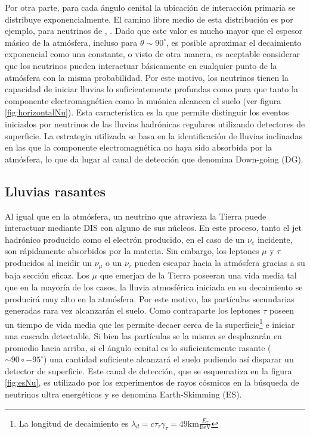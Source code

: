 Por otra parte, para cada \'angulo cenital la ubicaci\'on de interacci\'on primaria se distribuye exponencialmente.
El camino libre medio de esta distribuci\'on es por ejemplo, para neutrinos de , \cite{cite:Gandhi}. 
Dado que este valor es mucho mayor que el espesor m\'asico de la atmósfera, incluso para $\theta\sim90^\circ$, es posible aproximar el decaimiento exponencial como una constante, o visto de otra manera, es aceptable considerar que los neutrinos pueden interactuar básicamente en cualquier punto de la atmósfera con la misma probabilidad.
Por este motivo, los neutrinos tienen la capacidad de iniciar lluvias lo suficientemente profundas como para que tanto la componente electromagnética como la muónica alcancen el suelo (ver figura \ref{fig:horizontalNu}).
Esta caracter\'istica es la que permite distinguir los eventos iniciados por neutrinos de las lluvias hadr\'onicas regulares utilizando detectores de superficie.
La estrategia utilizada se basa en la identificaci\'on de lluvias inclinadas en las que la componente electromagnética no haya sido absorbida por la atmósfera, lo que da lugar al canal de detección que denomina Down-going (DG).

%
\subsection{Lluvias rasantes}
\label{sc:EStauInducedShowers}
%
Al igual que en la atm\'osfera, un neutrino que atravieza la Tierra puede interactuar mediante DIS con alguno de sus n\'ucleos.
En este proceso, tanto el jet hadrónico producido como el electrón producido, en el caso de un $\nu_e$ incidente, son rápidamente absorbidos por la materia.
Sin embargo, los leptones $\mu$ y $\tau$ producidos al incidir un $\nu_{\mu}$ o un $\nu_{\tau}$ pueden escapar hacia la atm\'osfera gracias a su baja sección eficaz.
Los $\mu$ que emerjan de la Tierra poseeran una vida media tal que en la mayor\'ia de los casos, la lluvia atmosf\'erica iniciada en su decaimiento se producir\'a muy alto en la atmósfera.
Por este motivo, las partículas secundarias generadas rara vez alcanzarán el suelo.
Como contraparte los leptones $\tau$ poseen un tiempo de vida media que les permite decaer cerca de la superficie\footnote{La longitud de decaimiento es $\lambda_{d}=c\tau_{\tau}\gamma_{\tau}=49\text{km}\frac{E_{\tau}}{\text{EeV}}$} e iniciar una cascada detectable.
Si bien las part\'iculas se la misma se desplazar\'an en promedio hacia arriba, si el \'angulo cenital es lo suficientemente rasante ($\sim 90\circ - 95^\circ$) una cantidad suficiente alcanzar\'a el suelo pudiendo as\'i disparar un detector de superficie.
Este canal de detección, que se esquematiza en la figura \ref{fig:esNu}, es utilizado por los experimentos de rayos c\'osmicos en la b\'usqueda de neutrinos ultra energ\'eticos y se denomina Earth-Skimming (ES).

